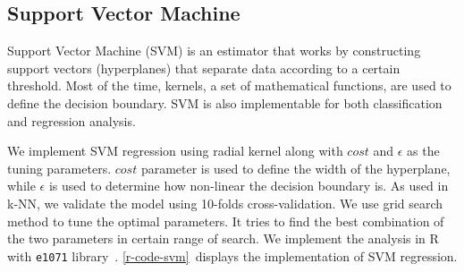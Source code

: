 


	\subsection{Support Vector Machine} %
	\label{sub:support_vector_machine}
	Support Vector Machine (\ac{SVM}) is an estimator that works by constructing support vectors (hyperplanes) that separate data according to a certain threshold. Most of the time, kernels, a set of mathematical functions, are used to
	define the decision boundary. \ac{SVM} is also implementable for both classification and regression analysis.

	We implement \ac{SVM} regression using radial kernel along with $cost$ and $\epsilon$ as the tuning parameters.
	$cost$ parameter is used to define the width of the hyperplane, while $\epsilon$ is used to determine how non-linear the decision boundary is.
	As used in \ac{k-NN}, we validate the model using 10-folds cross-validation.
	We use grid search method to tune the optimal parameters. It tries to find the best combination of the two parameters in certain range of search.
	We implement the analysis in R with \verb|e1071| library~\cite{e1071}. \autoref{r-code-svm}~displays the implementation of \ac{SVM} regression.


